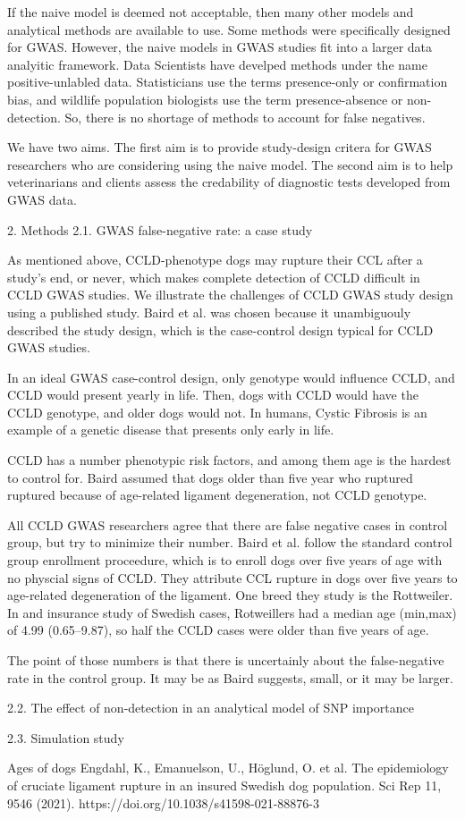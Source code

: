 If the naive model is deemed not acceptable, then many other models and analytical methods are available to use. Some methods were specifically designed for GWAS. However, the naive models in GWAS studies fit into a larger data analyitic framework. Data Scientists have develped methods under the name positive-unlabled data. Statisticians use the terms presence-only or confirmation bias, and wildlife population biologists use the term presence-absence or non-detection. So, there is no shortage of methods to account for false negatives.

We have two aims. The first aim is to provide study-design critera for GWAS researchers who are considering using the naive model. The second aim is to help veterinarians and clients assess the credability of diagnostic tests developed from GWAS data.

2. Methods
2.1. GWAS false-negative rate: a case study

As mentioned above, CCLD-phenotype dogs may rupture their CCL after a study's end, or never, which makes complete detection of CCLD difficult in CCLD GWAS studies. We illustrate the challenges of CCLD GWAS study design using a published study. Baird et al. was chosen because it unambiguouly described the study design, which is the case-control design typical for CCLD GWAS studies. 

In an ideal GWAS case-control  design, only genotype would influence CCLD, and CCLD would present yearly in life. Then, dogs with CCLD would have the CCLD genotype, and older dogs would not. In humans, Cystic Fibrosis is an example of a genetic disease that presents only early in life. 

CCLD has a number phenotypic risk factors, and among them age is the hardest to control for. Baird assumed that dogs older than five year who ruptured ruptured because of age-related ligament degeneration, not CCLD genotype. 

All CCLD GWAS researchers agree that there are false negative cases in control group, but try to minimize their number. Baird et al. follow the standard control group enrollment proceedure, which is to enroll dogs over five years of age with no physcial signs of CCLD.  They attribute CCL rupture in dogs over five years to age-related degeneration of the ligament. One breed they study is the Rottweiler. In and insurance study of Swedish cases, Rotweillers had a median age (min,max) of 4.99 (0.65–9.87), so half the CCLD cases were older than five years of age.

The point of those numbers is that there is uncertainly about the false-negative rate in the control group. It may be as Baird suggests, small, or it may be larger. 








2.2. The effect of non-detection in an analytical model of SNP importance

2.3. Simulation study 

Ages of dogs
Engdahl, K., Emanuelson, U., Höglund, O. et al. The epidemiology of cruciate ligament rupture in an insured Swedish dog population. Sci Rep 11, 9546 (2021). https://doi.org/10.1038/s41598-021-88876-3

